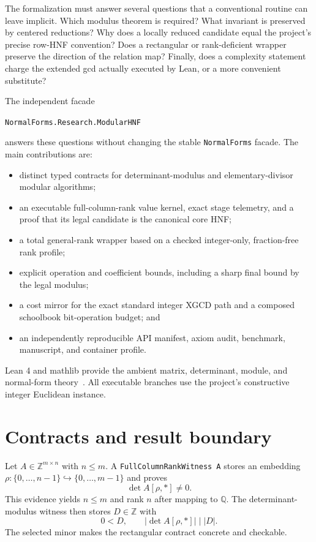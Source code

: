 \documentclass[11pt]{article}
\newcommand{\code}[1]{\texttt{#1}}
\newcommand{\Z}{\mathbb{Z}}
\newcommand{\Q}{\mathbb{Q}}
\begin{document}
The formalization must answer several questions that a conventional routine
can leave implicit.  Which modulus theorem is required?  What invariant is
preserved by centered reductions?  Why does a locally reduced candidate equal
the project's precise row-HNF convention?  Does a rectangular or
rank-deficient wrapper preserve the direction of the relation map?  Finally,
does a complexity statement charge the extended gcd actually executed by
Lean, or a more convenient substitute?

The independent facade
\begin{center}
  \code{NormalForms.Research.ModularHNF}
\end{center}
answers these questions without changing the stable \code{NormalForms}
facade.  The main contributions are:
\begin{itemize}
  \item distinct typed contracts for determinant-modulus and
        elementary-divisor modular algorithms;
  \item an executable full-column-rank value kernel, exact stage telemetry,
        and a proof that its legal candidate is the canonical core HNF;
  \item a total general-rank wrapper based on a checked integer-only,
        fraction-free rank profile;
  \item explicit operation and coefficient bounds, including a sharp final
        bound by the legal modulus;
  \item a cost mirror for the exact standard integer XGCD path and a composed
        schoolbook bit-operation budget; and
  \item an independently reproducible API manifest, axiom audit, benchmark,
        manuscript, and container profile.
\end{itemize}

Lean 4 and mathlib provide the ambient matrix, determinant, module, and
normal-form theory~\citep{deMouraUllrich2021Lean4,mathlib2020}.  All executable
branches use the project's constructive integer Euclidean instance.

\section{Contracts and result boundary}

Let $A\in\Z^{m\times n}$ with $n\le m$.  A
\code{FullColumnRankWitness A} stores an embedding
$\rho:\{0,\ldots,n-1\}\hookrightarrow\{0,\ldots,m-1\}$ and proves
\[
  \det A[\rho,*]\ne0.
\]
This evidence yields $n\le m$ and rank $n$ after mapping to $\Q$.  The
determinant-modulus witness then stores $D\in\Z$ with
\[
  0<D,
  \qquad |\det A[\rho,*]|\mid |D|.
\]
The selected minor makes the rectangular contract concrete and checkable.
\end{document}
